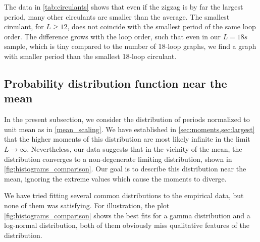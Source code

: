 \documentclass[12pt,a4paper]{article}
\renewcommand{\|}{\rule[-0.4ex]{0.2ex}{1.2em}}
\begin{document}
The data in \cref{tab:circulants} shows that even if the zigzag is by far the largest period, many other circulants are smaller than the average. The smallest circulant, for $L \geq 12$, does not coincide with the smallest period of the same loop order. The difference grows with the loop order, such that even in our $L=18s$ sample, which is tiny compared to the number of 18-loop graphs, we find a graph with smaller period than the smallest 18-loop circulant. 



\FloatBarrier


\subsection{Probability distribution function near the mean}\label{sec:distribution_central}

In the present subsection, we consider the distribution of periods normalized to unit mean as in \cref{mean_scaling}.
We have established in \cref{sec:moments,sec:largest} that the higher moments of this  distribution  are most likely infinite in the limit $L\rightarrow \infty$. Nevertheless, our data suggests that in the vicinity of the mean, the distribution  converges to a non-degenerate limiting distribution, shown in \cref{fig:histograms_comparison}. Our goal is to describe this distribution near the mean, ignoring the extreme values which cause the moments to diverge. 

We have tried fitting several common distributions to the empirical data, but none of them was satisfying. For illustration, the plot \cref{fig:histograms_comparison} shows the best fits for a gamma distribution and a log-normal distribution, both of them obviously miss qualitative features of the distribution.
\end{document}
